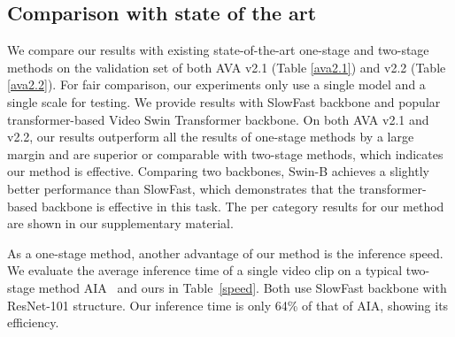 \documentclass[final]{cvpr}
\begin{document}
\subsection{Comparison with state of the art}
We compare our results with existing state-of-the-art one-stage and two-stage methods on the validation set of both AVA v2.1 (Table \ref{ava2.1}) and v2.2 (Table \ref{ava2.2}). For fair comparison, our experiments only use a single model and a single scale for testing. We provide results with SlowFast backbone and popular transformer-based Video Swin Transformer backbone. On both AVA v2.1 and v2.2, our results outperform all the results of one-stage methods by a large margin and are superior or comparable with two-stage methods, which indicates our method is effective. 
Comparing two backbones, Swin-B achieves a slightly better performance than SlowFast, which demonstrates that the transformer-based backbone is effective in this task. The per category results for our method are shown in our supplementary material.

As a one-stage method, another advantage of our method is the inference speed. We evaluate the average inference time of a single video clip on a typical two-stage method AIA~\cite{DBLP:conf/eccv/TangXMPL20} and ours in Table~\ref{speed}. Both use SlowFast backbone with ResNet-101 structure. Our inference time is only 64\% of that of AIA, showing its efficiency.

 
\end{document}

